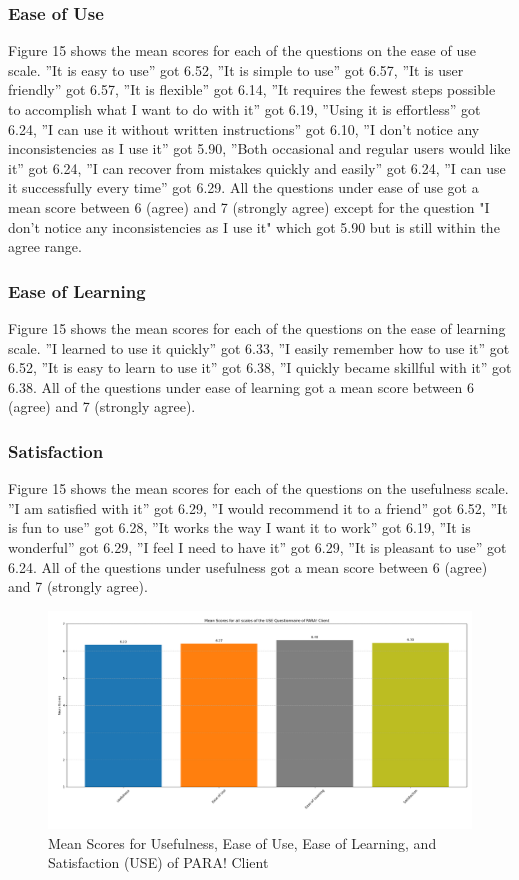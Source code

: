 \documentclass[journal]{./IEEE/IEEEtran}
\begin{document}
\subsubsection{Ease of Use}
Figure 15 shows the mean scores for each of the questions on the ease of use scale. ”It is easy to use” got 6.52, ”It is simple to use” got 6.57, ”It is user friendly” got 6.57, ”It is flexible” got 6.14, ”It requires the fewest steps possible to accomplish what I want to do with it” got 6.19, ”Using it is effortless” got 6.24, ”I can use it without written instructions” got 6.10, ”I don’t notice any inconsistencies as I use it” got 5.90, ”Both occasional and regular users would like it” got 6.24, ”I can recover from mistakes quickly and easily” got 6.24, ”I can use it successfully every time” got 6.29.
All the questions under ease of use got a mean score between 6 (agree) and 7 (strongly agree) except for the question "I don't notice any inconsistencies as I use it" which got 5.90 but is still within the agree range.
\subsubsection{Ease of Learning}
Figure 15 shows the mean scores for each of the questions on the ease of learning scale. ”I learned to use it quickly” got 6.33, ”I easily remember how to use it” got 6.52, ”It is easy to learn to use it” got 6.38, ”I quickly became skillful with it” got 6.38.
All of the questions under ease of learning got a mean score between 6 (agree) and 7 (strongly agree).
\subsubsection{Satisfaction}
Figure 15 shows the mean scores for each of the questions on the usefulness scale. ”I am satisfied with it” got 6.29, ”I would recommend it to a friend” got 6.52, ”It is fun to use” got 6.28, ”It works the way I want it to work” got 6.19, ”It is wonderful” got 6.29, ”I feel I need to have it” got 6.29, ”It is pleasant to use” got 6.24.
All of the questions under usefulness got a mean score between 6 (agree) and 7 (strongly agree).
\begin{figure}[h]
    \centering
        \includegraphics[scale=0.18]{./figures/client means total.png}
    \caption{Mean Scores for Usefulness, Ease of Use, Ease of Learning, and Satisfaction (USE) of PARA! Client}
\end{figure}
\end{document}
